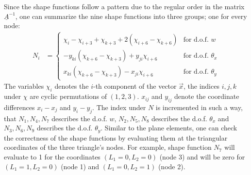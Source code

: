   Since the shape functions follow a pattern due to the regular order in the matrix $\underline{A}^{-1}$, one can summarize the nine shape functions into three groups; one for every node:
  \begin{align}
  N_i &= \begin{cases}
  \chi_i - \chi_{i+3} + \chi_{k+3} + 2\left(\chi_{i+6} - \chi_{k+6}\right) & \text{for d.o.f. } w\\
  -y_{ki}\left(\chi_{k+6} - \chi_{k+3}\right) + y_{ji} \chi_{i+6} & \text{for d.o.f. } \theta_x\\
  x_{ki}\left(\chi_{k+6} - \chi_{k+3}\right) - x_{ji} \chi_{i+6} & \text{for d.o.f. } \theta_y
  \end{cases}
  \end{align}
  The variables $\chi_i$ denotes the $i$-th component of the vector $\vec{x}$, the indices $i,j,k$ under $\chi$ are cyclic permutations of $(1,2,3)$. $x_{ij}$ and $y_{ij}$ denote the coordinate differences $x_i - x_j$ and $y_i - y_j$. The index under $N$ is incremented in such a way, that $N_1, N_4, N_7$ describes the d.o.f. $w$, $N_2, N_5, N_8$ describes the d.o.f. $\theta_x$ and $N_3, N_6, N_9$ describes the d.o.f. $\theta_y$.
  Similar to the plane elements, one can check the correctness of the shape functions by evaluating them at the triangular coordinates of the three triangle's nodes. For example, shape function $N_7$ will evaluate to 1 for the coordinates $(L_1 = 0, L_2 = 0)$ (node 3) and will be zero for $(L_1 = 1, L_2 = 0)$ (node 1) and $(L_1 = 0, L_2 = 1)$ (node 2).
  
